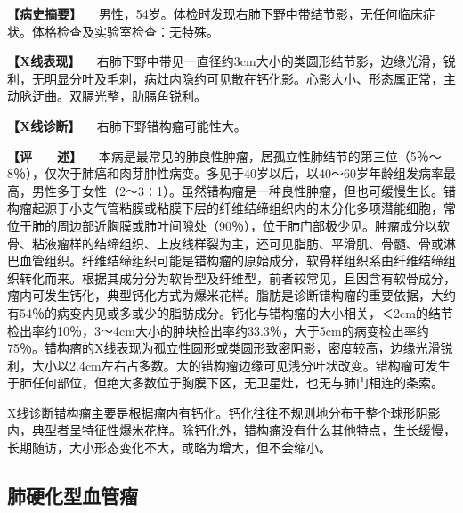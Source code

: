 \textbf{【病史摘要】}
　男性，54岁。体检时发现右肺下野中带结节影，无任何临床症状。体格检查及实验室检查：无特殊。

\textbf{【X线表现】}
　右肺下野中带见一直径约3cm大小的类圆形结节影，边缘光滑，锐利，无明显分叶及毛刺，病灶内隐约可见散在钙化影。心影大小、形态属正常，主动脉迂曲。双膈光整，肋膈角锐利。

\textbf{【X线诊断】} 　右肺下野错构瘤可能性大。

\textbf{【评　　述】}
　本病是最常见的肺良性肿瘤，居孤立性肺结节的第三位（5％～8％），仅次于肺癌和肉芽肿性病变。多见于40岁以后，以40～60岁年龄组发病率最高，男性多于女性（2～3∶1）。虽然错构瘤是一种良性肿瘤，但也可缓慢生长。错构瘤起源于小支气管粘膜或粘膜下层的纤维结缔组织内的未分化多项潜能细胞，常位于肺的周边部近胸膜或肺叶间隙处（90％），位于肺门部极少见。肿瘤成分以软骨、粘液瘤样的结缔组织、上皮线样裂为主，还可见脂肪、平滑肌、骨髓、骨或淋巴血管组织。纤维结缔组织可能是错构瘤的原始成分，软骨样组织系由纤维结缔组织转化而来。根据其成分分为软骨型及纤维型，前者较常见，且因含有软骨成分，瘤内可发生钙化，典型钙化方式为爆米花样。脂肪是诊断错构瘤的重要依据，大约有54％的病变内见或多或少的脂肪成分。钙化与错构瘤的大小相关，＜2cm的结节检出率约10％，3～4cm大小的肿块检出率约33.3％，大于5cm的病变检出率约75％。错构瘤的X线表现为孤立性圆形或类圆形致密阴影，密度较高，边缘光滑锐利，大小以2.4cm左右占多数。大的错构瘤边缘可见浅分叶状改变。错构瘤可发生于肺任何部位，但绝大多数位于胸膜下区，无卫星灶，也无与肺门相连的条索。

X线诊断错构瘤主要是根据瘤内有钙化。钙化往往不规则地分布于整个球形阴影内，典型者呈特征性爆米花样。除钙化外，错构瘤没有什么其他特点，生长缓慢，长期随访，大小形态变化不大，或略为增大，但不会缩小。

\subsection{肺硬化型血管瘤}

